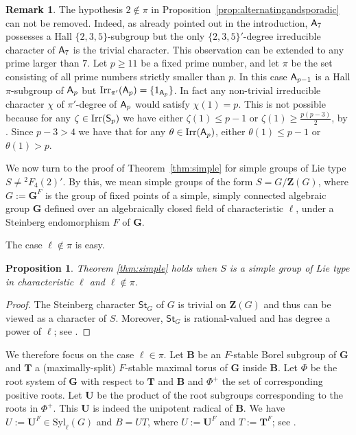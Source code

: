 \documentclass[12pt]{amsart}
\newtheorem{proposition}[theorem]{Proposition}
\theoremstyle{definition}
\newtheorem{remark}[theorem]{Remark}
\numberwithin{equation}{section}
\newcommand{\Syl}{{\mathrm {Syl}}}
\newcommand{\St}{{\mathsf {St}}}
\newcommand{\bG}{{\mathbf{G}}}
\newcommand{\bT}{{\mathbf{T}}}
\newcommand{\bB}{{\mathbf{B}}}
\newcommand{\bU}{{\mathbf{U}}}
\newcommand{\bZ}{{\mathbf{Z}}}
\newcommand{\Al}{\textup{\textsf{A}}}
\newcommand{\Sy}{\textup{\textsf{S}}}
\begin{document}

\begin{remark}
The hypothesis $2\notin \pi$ in
Proposition~\ref{prop:alternatingandsporadic} can not be removed.
Indeed, as already pointed out in the introduction, $\Al_7$
possesses a Hall $\{2,3,5\}$-subgroup but the only
$\{2,3,5\}'$-degree irreducible character of $\Al_7$ is the trivial
character. This observation can be extended to any prime larger than
$7$. Let $p\geq 11$ be a fixed prime number, and let $\pi$ be the
set consisting of all prime numbers strictly smaller than $p$. In
this case $\Al_{p-1}$ is a Hall $\pi$-subgroup of $\Al_p$ but
$\mathrm{Irr}_{\pi'}(\Al_p)=\{1_{\Al_p}\}$. In fact any non-trivial
irreducible character $\chi$ of $\pi'$-degree of $\Al_p$ would
satisfy $\chi(1)=p$. This is not possible because for any
$\zeta\in\mathrm{Irr}(\Sy_p)$ we have either $\zeta(1)\leq p-1$ or
$\zeta(1)\geq \frac{p(p-3)}{2}$, by \cite{Rasala}. Since $p-3> 4$ we
have that for any $\theta\in\mathrm{Irr}(\Al_p)$, either
$\theta(1)\leq p-1$ or $\theta(1)>p$.
\end{remark}

\smallskip

We now turn to the proof of Theorem~\ref{thm:simple} for simple
groups of Lie type $S \neq {}^2F_4(2)'$. By this, we mean simple
groups of the form $S = G/\bZ(G)$, where $G := \bG^F$ is the group
of fixed points of a simple, simply connected algebraic group $\bG$
defined over an algebraically closed field of characteristic $\ell$,
under a Steinberg endomorphism $F$ of $\bG$.

The case $\ell\notin\pi$ is easy.

\begin{proposition}\label{prop:ell-notin-pi}
Theorem \ref{thm:simple} holds when $S$ is a simple group of Lie
type in characteristic $\ell$ and $\ell\notin\pi$.
\end{proposition}

\begin{proof}
The Steinberg character $\St_G$ of $G$ is trivial on $\bZ(G)$ and
thus can be viewed as a character of $S$. Moreover, $\St_G$ is
rational-valued and has degree a power of $\ell$; see
\cite[Proposition~3.4.10]{GeckMalle}.
\end{proof}

We therefore focus on the case $\ell\in\pi$. Let $\bB$ be an
$F$-stable Borel subgroup of $\bG$ and $\bT$ a (maximally-split)
$F$-stable maximal torus of $\bG$ inside $\bB$. Let $\Phi$ be the
root system of $\bG$ with respect to $\bT$ and $\bB$ and $\Phi^+$
the set of corresponding positive roots. Let $\bU$ be the product of
the root subgroups corresponding to the roots in $\Phi^+$. This
$\bU$ is indeed the unipotent radical of $\bB$. We have
$U:=\bU^F\in\Syl_\ell(G)$ and $B=UT$, where $U:=\bU^F$ and
$T:=\bT^F$; see \cite[\S1.9 and \S2.9]{Carter85}.
\end{document}
